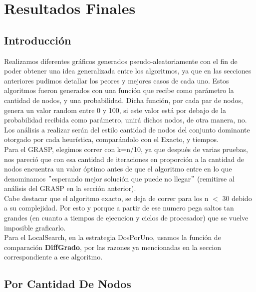 \section{Resultados Finales}

\subsection{Introducción}

Realizamos diferentes gráficos generados pseudo-aleatoriamente con el fin de poder obtener una idea generalizada entre los algoritmos, ya que en las secciones anteriores pudimos
detallar los peores y mejores casos de cada uno. Estos algoritmos fueron generados con una función que recibe como parámetro la cantidad de nodos, y una probabilidad. Dicha función, por cada par de nodos, genera un valor random entre 0 y 100, si este valor está por debajo de la probabilidad recibida como parámetro, unirá dichos nodos, de otra manera, no.\\
Los análisis a realizar serán del estilo cantidad de nodos del conjunto dominante otorgado por cada heurística, comparándolo con el Exacto, y tiempos.\\
Para el GRASP, elegimos correr con k=n/10, ya que después de varias pruebas, nos pareció que con esa cantidad de iteraciones en proporción a la cantidad de nodos encuentra un valor óptimo antes de que el algoritmo entre en lo que denominamos $"$esperando mejor solución que puede no llegar$"$ (remitirse al análisis del GRASP en la sección anterior).\\
Cabe destacar que el algoritmo exacto, se deja de correr para los n $<$ 30 debido a su complejidad. Por esto y porque a partir de ese numero pega saltos tan grandes (en cuanto a tiempos de ejecucion y ciclos de procesador) que se vuelve imposible graficarlo.\\
Para el LocalSearch, en la estrategia DosPorUno, usamos la función de comparación \textbf{DiffGrado}, por las razones ya mencionadas en la seccion correspondiente a ese algoritmo.\\



\subsection{Por Cantidad De Nodos}

